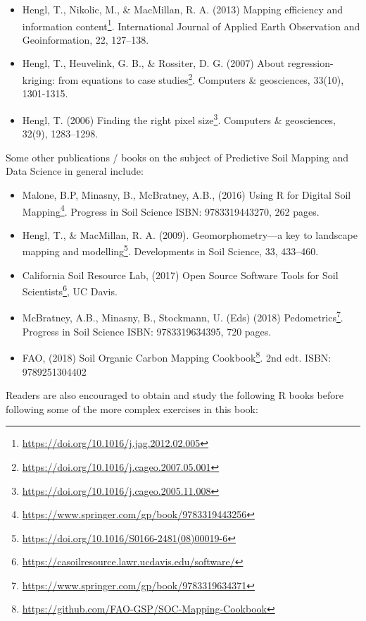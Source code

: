 \documentclass[graybox,natbib,nospthms,UStrade]{svmono}
\renewcommand{\href}[2]{#2 (\url{#1})}
\renewcommand{\href}[2]{#2\footnote{\url{#1}}}
\begin{document}
\begin{itemize}
\item
  Hengl, T., Nikolic, M., \& MacMillan, R. A. (2013) \href{https://doi.org/10.1016/j.jag.2012.02.005}{Mapping efficiency and information content}. International Journal of Applied Earth Observation and Geoinformation, 22, 127--138.
\item
  Hengl, T., Heuvelink, G. B., \& Rossiter, D. G. (2007) \href{https://doi.org/10.1016/j.cageo.2007.05.001}{About regression-kriging: from equations to case studies}. Computers \& geosciences, 33(10), 1301-1315.
\item
  Hengl, T. (2006) \href{https://doi.org/10.1016/j.cageo.2005.11.008}{Finding the right pixel size}. Computers \& geosciences, 32(9), 1283--1298.
\end{itemize}

Some other publications / books on the subject of Predictive Soil Mapping and Data Science in general include:

\begin{itemize}
\item
  Malone, B.P, Minasny, B., McBratney, A.B., (2016) \href{https://www.springer.com/gp/book/9783319443256}{Using R for Digital Soil Mapping}. Progress in Soil Science
  ISBN: 9783319443270, 262 pages.
\item
  Hengl, T., \& MacMillan, R. A. (2009). \href{https://doi.org/10.1016/S0166-2481(08)00019-6}{Geomorphometry---a key to landscape mapping and modelling}. Developments in Soil Science, 33, 433--460.
\item
  California Soil Resource Lab, (2017) \href{https://casoilresource.lawr.ucdavis.edu/software/}{Open Source Software Tools for Soil Scientists}, UC Davis.
\item
  McBratney, A.B., Minasny, B., Stockmann, U. (Eds) (2018) \href{https://www.springer.com/gp/book/9783319634371}{Pedometrics}. Progress in Soil Science
  ISBN: 9783319634395, 720 pages.
\item
  FAO, (2018) \href{https://github.com/FAO-GSP/SOC-Mapping-Cookbook}{Soil Organic Carbon Mapping Cookbook}. 2nd edt. ISBN: 9789251304402
\end{itemize}

Readers are also encouraged to obtain and study the following R books before following some of the more complex exercises in this book:
\end{document}

